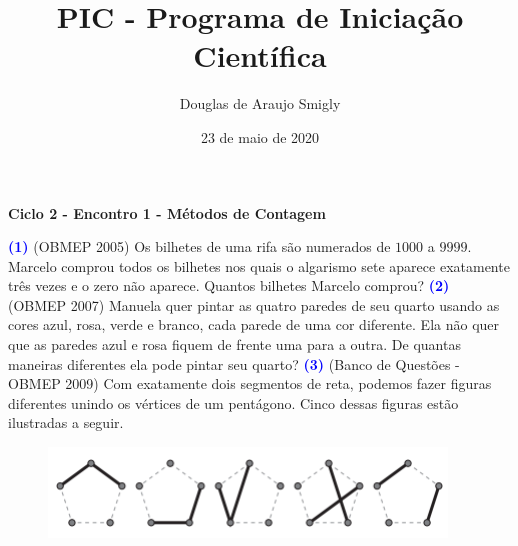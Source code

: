 \documentclass[12pt, a4paper]{article}
\title{PIC - Programa de Iniciação Científica}
\author{Douglas de Araujo Smigly}
\date{23 de maio de 2020}
\begin{document}
\maketitle
\begin{center}
\large\textbf{\textcolor{Floresta}{Ciclo 2 - Encontro 1 - Métodos de Contagem}}\\
\end{center}
\textcolor{blue}{\bf(1)} (OBMEP 2005) Os bilhetes de uma rifa são numerados de $1000$ a $9999.$ Marcelo comprou todos os bilhetes nos quais o algarismo sete aparece exatamente três vezes e o zero não aparece. Quantos bilhetes Marcelo comprou?
\newline\newline
\textcolor{blue}{\bf(2)} (OBMEP 2007) Manuela quer pintar as quatro paredes de seu quarto usando as cores azul, rosa, verde e branco, cada parede de uma cor diferente. Ela não quer que as paredes azul e rosa fiquem de frente uma para a outra. De quantas maneiras diferentes ela pode pintar seu quarto?
\newline\newline
\textcolor{blue}{\bf(3)} (Banco de Questões - OBMEP 2009) Com exatamente dois segmentos de reta, podemos fazer figuras diferentes unindo os vértices de um pentágono. Cinco dessas figuras estão ilustradas a seguir.
\begin{figure}[!h]
    \centering
    \includegraphics{Figuras/q3c2e1.png}
\end{figure}
\end{document}
